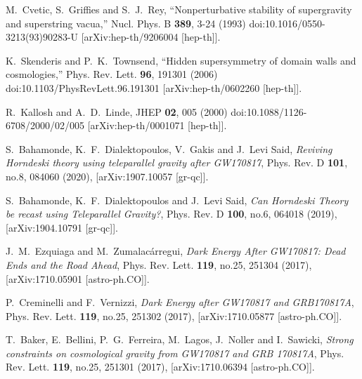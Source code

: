 \documentclass[aps,12pt, a4paper,nofootinbib]{revtex4}
\begin{document}
{\begin{thebibliography}{99}
M.~Cvetic, S.~Griffies and S.~J.~Rey,
``Nonperturbative stability of supergravity and superstring vacua,''
Nucl. Phys. B \textbf{389}, 3-24 (1993)
doi:10.1016/0550-3213(93)90283-U
[arXiv:hep-th/9206004 [hep-th]].

K.~Skenderis and P.~K.~Townsend,
``Hidden supersymmetry of domain walls and cosmologies,''
Phys. Rev. Lett. \textbf{96}, 191301 (2006)
doi:10.1103/PhysRevLett.96.191301
[arXiv:hep-th/0602260 [hep-th]].

R.~Kallosh and A.~D.~Linde,
JHEP \textbf{02}, 005 (2000)
doi:10.1088/1126-6708/2000/02/005
[arXiv:hep-th/0001071 [hep-th]].

S.~Bahamonde, K.~F.~Dialektopoulos, V.~Gakis and J.~Levi Said,
{\it Reviving Horndeski theory using teleparallel gravity after GW170817},
Phys. Rev. D \textbf{101}, no.8, 084060 (2020),
[arXiv:1907.10057 [gr-qc]].

S.~Bahamonde, K.~F.~Dialektopoulos and J.~Levi Said,
{\it Can Horndeski Theory be recast using Teleparallel Gravity?},
Phys. Rev. D \textbf{100}, no.6, 064018 (2019),
[arXiv:1904.10791 [gr-qc]].

J.~M.~Ezquiaga and M.~Zumalac\'arregui,
{\it Dark Energy After GW170817: Dead Ends and the Road Ahead},
Phys. Rev. Lett. \textbf{119}, no.25, 251304 (2017),
[arXiv:1710.05901 [astro-ph.CO]].

P.~Creminelli and F.~Vernizzi,
{\it Dark Energy after GW170817 and GRB170817A},
Phys. Rev. Lett. \textbf{119}, no.25, 251302 (2017),
[arXiv:1710.05877 [astro-ph.CO]].

T.~Baker, E.~Bellini, P.~G.~Ferreira, M.~Lagos, J.~Noller and I.~Sawicki,
{\it Strong constraints on cosmological gravity from GW170817 and GRB 170817A},
Phys. Rev. Lett. \textbf{119}, no.25, 251301 (2017),
[arXiv:1710.06394 [astro-ph.CO]].
	

\end{thebibliography}}
\end{document}
